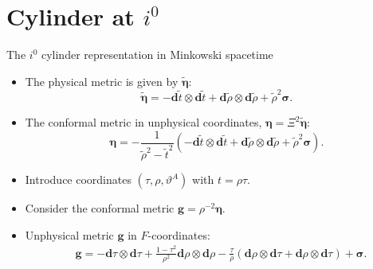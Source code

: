 \documentclass{beamer}
\theoremstyle{remark}
\theoremstyle{plain}
\theoremstyle{plain}
\begin{document}
\section{Cylinder at $i^0$}
\begin{frame}{The $i^0$ cylinder representation in Minkowski  spacetime}
  \begin{itemize}
    \item The physical metric is given by $\tilde{\boldsymbol{\eta}}$:
    \begin{equation}
      \tilde{\boldsymbol{\eta}}=-\mathbf{d} \tilde{t} \otimes \mathbf{d} \tilde{t}+\mathbf{d} \tilde{\rho} \otimes \mathbf{d} \tilde{\rho}+\tilde{\rho}^2 \boldsymbol{\sigma}. \nonumber
    \end{equation}
    \item The conformal metric in unphysical coordinates, $\boldsymbol{\eta} = \Xi^2 \boldsymbol{\tilde{\eta}}$: 
    \begin{equation}
      \boldsymbol{\eta} = -\frac{1}{\tilde{\rho}^2 - \tilde{t}^2} (-\mathbf{d} \tilde{t} \otimes \mathbf{d} \tilde{t} + \mathbf{d} \tilde{\rho} \otimes \mathbf{d} \tilde{\rho} + \tilde{\rho}^2 \boldsymbol{\sigma}). \nonumber
    \end{equation}
    \item Introduce coordinates $(\tau, \rho, \vartheta^A)$ with $t = \rho \tau$.
    \item Consider the conformal metric $\boldsymbol{g} = \rho^{-2} \boldsymbol{\eta}$.
    \item Unphysical metric $\boldsymbol{g}$ in $F$-coordinates:
    \begin{align}
      & \boldsymbol{g} = -\mathbf{d} \tau \otimes \mathbf{d} \tau + \frac{1 - \tau^2}{\rho^2} \mathbf{d} \rho \otimes \mathbf{d} \rho - \frac{\tau}{\rho} \left(\mathbf{d} \rho \otimes \mathbf{d} \tau + \mathbf{d} \rho \otimes \mathbf{d} \tau\right) + \boldsymbol{\sigma}. \nonumber
    \end{align}
  \end{itemize}
\end{frame}
\end{document}
